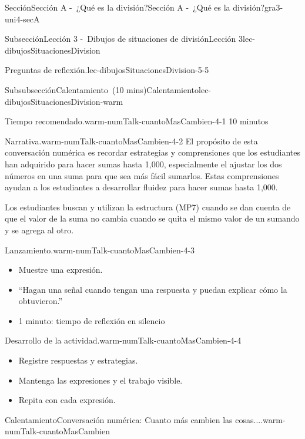 \documentclass[oneside,10pt,]{article}
\begin{document}
\begin{sectionptx}{Sección}{Sección A -~¿Qué es la división?}{}{Sección A -~¿Qué es la división?}{}{}{gra3-uni4-secA}
\begin{subsectionptx}{Subsección}{Lección 3 -~Dibujos de situaciones de división}{}{Lección 3}{}{}{lec-dibujosSituacionesDivision}
\begin{introduction}{}
\begin{paragraphs}{Preguntas de reflexión.}{lec-dibujosSituacionesDivision-5-5}
\end{paragraphs}%
\end{introduction}%
%
%
\typeout{************************************************}
\typeout{************************************************}
%
\begin{subsubsectionptx}{Subsubsección}{Calentamiento~(10 mins)}{}{Calentamiento}{}{}{lec-dibujosSituacionesDivision-warm}
\par
\begin{paragraphs}{Tiempo recomendado.}{warm-numTalk-cuantoMasCambien-4-1}%
10 minutos%
\end{paragraphs}%
\begin{paragraphs}{Narrativa.}{warm-numTalk-cuantoMasCambien-4-2}%
El propósito de esta conversación numérica es recordar estrategias y comprensiones que los estudiantes han adquirido para hacer sumas hasta 1,000, especialmente el ajustar los dos números en una suma para que sea más fácil sumarlos. Estas comprensiones ayudan a los estudiantes a desarrollar fluidez para hacer sumas hasta 1,000.%
\par
Los estudiantes buscan y utilizan la estructura (MP7) cuando se dan cuenta de que el valor de la suma no cambia cuando se quita el mismo valor de un sumando y se agrega al otro.%
\end{paragraphs}%
\begin{paragraphs}{Lanzamiento.}{warm-numTalk-cuantoMasCambien-4-3}%
%
\begin{itemize}[label=\textbullet]
\item{}Muestre una expresión.%
\item{}``Hagan una señal cuando tengan una respuesta y puedan explicar cómo la obtuvieron.''%
\item{}1 minuto: tiempo de reflexión en silencio%
\end{itemize}
\end{paragraphs}%
\begin{paragraphs}{Desarrollo de la actividad.}{warm-numTalk-cuantoMasCambien-4-4}%
%
\begin{itemize}[label=\textbullet]
\item{}Registre respuestas y estrategias.%
\item{}Mantenga las expresiones y el trabajo visible.%
\item{}Repita con cada expresión.%
\end{itemize}
\end{paragraphs}%
\begin{exploration}{Calentamiento}{Conversación numérica: Cuanto más cambien las cosas....}{warm-numTalk-cuantoMasCambien}%

\end{exploration}
\end{subsubsectionptx}
\end{subsectionptx}
\end{sectionptx}
\end{document}
